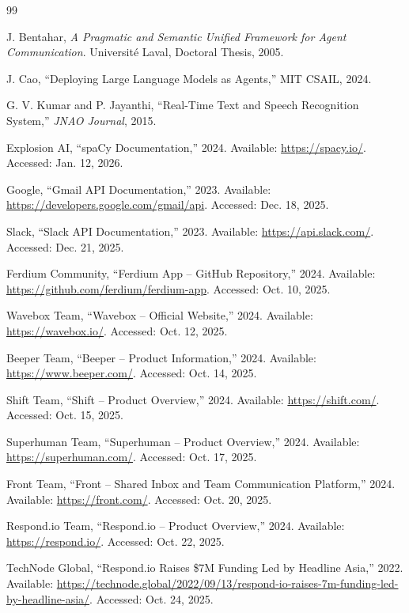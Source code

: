 \begingroup
\small
\sloppy
\raggedright
\begin{thebibliography}{99}

J. Bentahar, \emph{A Pragmatic and Semantic Unified Framework for Agent Communication}. Université Laval, Doctoral Thesis, 2005.

J. Cao, ``Deploying Large Language Models as Agents,'' MIT CSAIL, 2024.

G. V. Kumar and P. Jayanthi, ``Real-Time Text and Speech Recognition System,'' \emph{JNAO Journal}, 2015.

Explosion AI, ``spaCy Documentation,'' 2024. Available: \url{https://spacy.io/}. Accessed: Jan. 12, 2026.

Google, ``Gmail API Documentation,'' 2023. Available: \url{https://developers.google.com/gmail/api}. Accessed: Dec. 18, 2025.

Slack, ``Slack API Documentation,'' 2023. Available: \url{https://api.slack.com/}. Accessed: Dec. 21, 2025.

Ferdium Community, ``Ferdium App -- GitHub Repository,'' 2024. Available: \url{https://github.com/ferdium/ferdium-app}. Accessed: Oct. 10, 2025.

Wavebox Team, ``Wavebox -- Official Website,'' 2024. Available: \url{https://wavebox.io/}. Accessed: Oct. 12, 2025.

Beeper Team, ``Beeper -- Product Information,'' 2024. Available: \url{https://www.beeper.com/}. Accessed: Oct. 14, 2025.

Shift Team, ``Shift -- Product Overview,'' 2024. Available: \url{https://shift.com/}. Accessed: Oct. 15, 2025.

Superhuman Team, ``Superhuman -- Product Overview,'' 2024. Available: \url{https://superhuman.com/}. Accessed: Oct. 17, 2025.

Front Team, ``Front -- Shared Inbox and Team Communication Platform,'' 2024. Available: \url{https://front.com/}. Accessed: Oct. 20, 2025.

Respond.io Team, ``Respond.io -- Product Overview,'' 2024. Available: \url{https://respond.io/}. Accessed: Oct. 22, 2025.

TechNode Global, ``Respond.io Raises \$7M Funding Led by Headline Asia,'' 2022. Available: \url{https://technode.global/2022/09/13/respond-io-raises-7m-funding-led-by-headline-asia/}. Accessed: Oct. 24, 2025.


\end{thebibliography}
